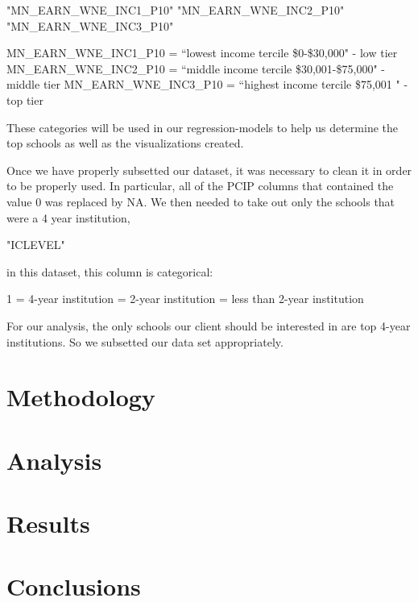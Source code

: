 \documentclass{article}
\begin{document}
\begin{Schunk}
\begin{Soutput}
[1] "MN_EARN_WNE_INC1_P10" "MN_EARN_WNE_INC2_P10" "MN_EARN_WNE_INC3_P10"
\end{Soutput}
\end{Schunk}

MN\_EARN\_WNE\_INC1\_P10 = ``lowest income tercile \$0-\$30,000" - low tier \newline
MN\_EARN\_WNE\_INC2\_P10 = ``middle income tercile \$30,001-\$75,000" - middle tier \newline
MN\_EARN\_WNE\_INC3\_P10 = ``highest income tercile \$75,001  " - top tier \newline

These categories will be used in our regression-models to help us determine the top schools as well as the visualizations created.

Once we have properly subsetted our dataset, it was necessary to clean it in order to be properly used.  In particular, all of the PCIP columns that contained the value 0 was replaced by NA.  We then needed to take out only the schools that were a 4 year institution, 
\begin{Schunk}
\begin{Soutput}
[1] "ICLEVEL"
\end{Soutput}
\end{Schunk}
in this dataset, this column is categorical: 
  \begin{flushleft}
  1 = 4-year institution  = 2-year institution  = less than 2-year institution \newline
  \end{flushleft}
  For our analysis, the only schools our client should be interested in are top 4-year institutions.  So we subsetted our data set appropriately.

\section{Methodology}

\section{Analysis}

\section{Results}

\section{Conclusions}
\end{document}
